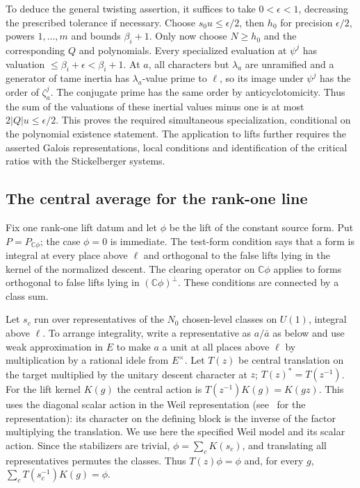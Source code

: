 To deduce the general twisting assertion, it suffices to take
\(0<\epsilon<1\), decreasing the prescribed tolerance if necessary.
Choose \(s_0u\le\epsilon/2\), then \(h_0\) for precision
\(\epsilon/2\), powers \(1,\ldots,m\) and bounds \(\beta_i+1\).
Only now choose \(N\ge h_0\) and the corresponding \(Q\) and
polynomials. Every specialized evaluation at \(\psi^j\) has valuation
\(\le\beta_i+\epsilon<\beta_i+1\). At \(a\), all characters but
\(\lambda_a\) are unramified and a generator of tame inertia has
\(\lambda_a\)-value prime to \(\ell\), so its image under \(\psi^j\)
has the order of \(\zeta_a^j\). The conjugate prime has the same
order by anticyclotomicity. Thus the sum of the valuations of these
inertial values minus one is at most \(2|Q|u\le\epsilon/2\).
This proves the required simultaneous specialization, conditional on
the polynomial existence statement. The application to lifts further
requires the asserted Galois representations, local conditions and
identification of the critical ratios with the Stickelberger systems.

\subsection{The central average for the rank-one line}
\label{c4:central-average}
Fix one rank-one lift datum and let \(\phi\) be the lift of the
constant source form. Put \(P=P_{\mathbb C\phi}\); the case
\(\phi=0\) is immediate. The test-form condition says that a form is
integral at every place above \(\ell\) and orthogonal to the false
lifts lying in the kernel of the normalized descent. The clearing
operator on \(\mathbb C\phi\) applies to forms orthogonal to false
lifts lying in \((\mathbb C\phi)^\perp\). These conditions are
connected by a class sum.

Let \(s_c\) run over representatives of the \(N_0\) chosen-level
classes on \(U(1)\), integral above \(\ell\). To arrange integrality,
write a representative as \(a/\bar a\) as below and use weak
approximation in \(E\) to make \(a\) a unit at all places above
\(\ell\) by multiplication by a rational idele from \(E^\times\).
Let \(T(z)\) be central translation on the target multiplied by
the unitary descent character at \(z\); \(T(z)^*=T(z^{-1})\).
For the lift kernel \(K(g)\) the central action is
\(T(z^{-1})K(g)=K(gz)\). This uses the diagonal scalar action in the
Weil representation (see~\cite{weil} for the representation): its character on the defining block is the
inverse of the factor multiplying the translation. We use here the
specified Weil model and its scalar action. Since the stabilizers
are trivial, \(\phi=\sum_c K(s_c)\), and translating all representatives
permutes the classes. Thus \(T(z)\phi=\phi\) and, for every \(g\),
\(\sum_c T(s_c^{-1})K(g)=\phi\).

